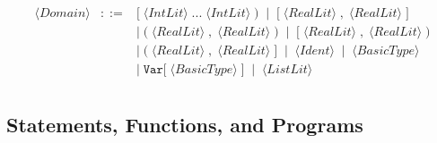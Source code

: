 \documentclass{article}
\begin{document}
\[\begin{array}{rcl}
\langle \mathit{Domain} \rangle
&::=&
\mathtt{[}\; \langle \mathit{IntLit} \rangle \; \mathtt{...}\; \langle \mathit{IntLit} \rangle \; \mathtt{)}
\;\mid\;
\mathtt{[}\; \langle \mathit{RealLit} \rangle \; \mathtt{,}\; \langle \mathit{RealLit} \rangle \; \mathtt{]} \\[2pt]
&&
\mid\;
\mathtt{(}\; \langle \mathit{RealLit} \rangle \; \mathtt{,}\; \langle \mathit{RealLit} \rangle \; \mathtt{)}
\;\mid\;
\mathtt{[}\; \langle \mathit{RealLit} \rangle \; \mathtt{,}\; \langle \mathit{RealLit} \rangle \; \mathtt{)} \\[2pt]
&&
\mid\;
\mathtt{(}\; \langle \mathit{RealLit} \rangle \; \mathtt{,}\; \langle \mathit{RealLit} \rangle \; \mathtt{]}
\;\mid\;
\langle \mathit{Ident} \rangle
\;\mid\;
\langle \mathit{BasicType} \rangle \\[2pt]
&&
\mid\;
\mathtt{Var[} \; \langle \mathit{BasicType} \rangle \; \mathtt{]}
\;\mid\;
\langle \mathit{ListLit} \rangle \\[4pt]
\end{array}
\]


\subsection{Statements, Functions, and Programs}
\end{document}
